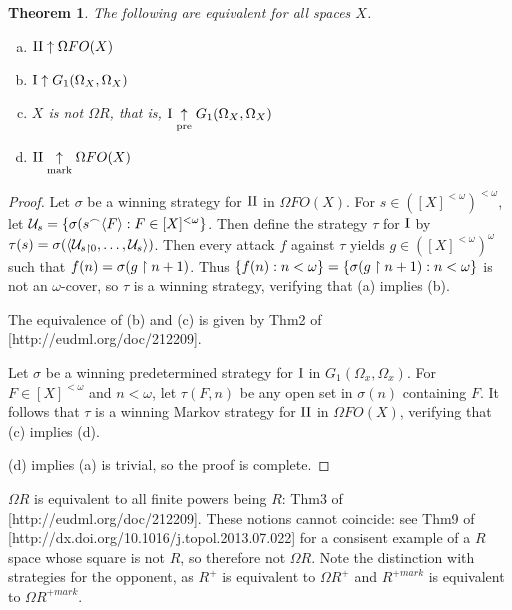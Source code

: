 \documentclass[11pt]{article}
\theoremstyle{plain}
\newtheorem{theorem}{Theorem}
\theoremstyle{definition}
\theoremstyle{remark}
\theoremstyle{plain}
\theoremstyle{definition}
\theoremstyle{remark}
\begin{document}
\begin{theorem}
The following are equivalent for all spaces \(X\).
\begin{enumerate}[a)]
\item \(\mathrm{II}\uparrow \Omega FO(X)\)
\item \(\mathrm{I}\uparrow G_1(\Omega_X,\Omega_X)\)
\item \(X\) is not \(\Omega R\), that is, \(\mathrm{I}\underset{\text{pre}}{\uparrow} G_1(\Omega_X,\Omega_X)\)
\item \(\mathrm{II}\underset{\text{mark}}{\uparrow} \Omega FO(X)\)
\end{enumerate}
\end{theorem}
\begin{proof}
Let \(\sigma\) be a winning strategy for \(\mathrm{II}\) in \(\Omega FO(X)\).
For \(s\in([X]^{<\omega})^{<\omega}\), let 
\(\mathcal{U}_s=\{\sigma(s{^\frown}\langle F\rangle:F\in[X]^{<\omega}\}\).
Then define the strategy \(\tau\) for \(\mathrm{I}\) by 
\(\tau(s)=\sigma(\langle\mathcal{U}_{s\restriction 0},\dots,\mathcal{U}_s\rangle)\).
Then every attack \(f\) against \(\tau\) yields \(g\in([X]^{<\omega})^\omega\)
such that \(f(n)=\sigma(g\restriction n+1)\). Thus 
\(\{f(n):n<\omega\}=\{\sigma(g\restriction n+1):n<\omega\}\)
is not an \(\omega\)-cover, so \(\tau\) is a winning strategy,
verifying that (a) implies (b).

The equivalence of (b) and (c) is given by Thm2 of
[http://eudml.org/doc/212209].

Let \(\sigma\) be a winning predetermined strategy for \(\mathrm{I}\)
in \(G_1(\Omega_x,\Omega_x)\). For \(F\in[X]^{<\omega}\) and
\(n<\omega\), let \(\tau(F,n)\) be any open set in \(\sigma(n)\)
containing \(F\). It follows that \(\tau\) is a winning Markov
strategy for \(\mathrm{II}\) in \(\Omega FO(X)\), verifying that
(c) implies (d).

(d) implies (a) is trivial, so the proof is complete.
\end{proof}

\(\Omega R\) is equivalent to all finite powers being \(R\):
Thm3 of [http://eudml.org/doc/212209].
These notions cannot coincide: see Thm9 of 
[http://dx.doi.org/10.1016/j.topol.2013.07.022] 
for a consisent example of a \(R\) space whose square
is not \(R\), so therefore not \(\Omega R\). 
Note the distinction with strategies for the opponent, as \(R^+\) is
equivalent to \(\Omega R^+\) and \(R^{+mark}\) is
equivalent to \(\Omega R^{+mark}\).
\end{document}
